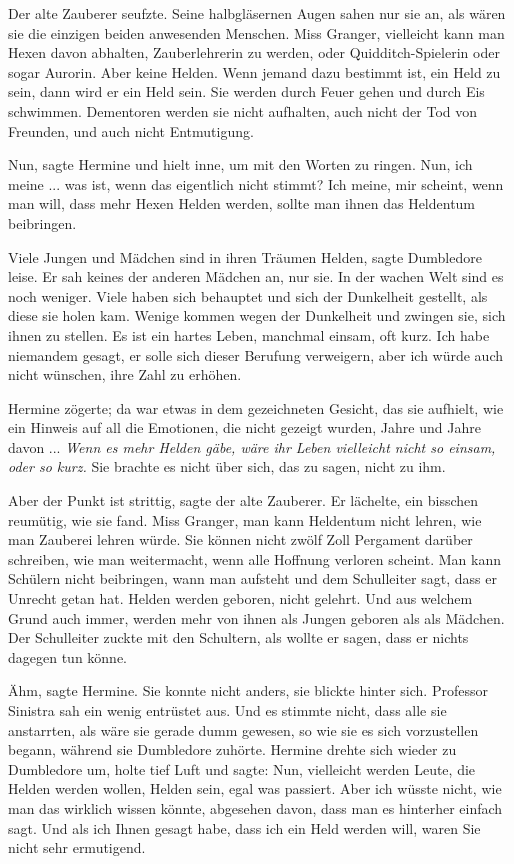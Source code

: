 Der alte Zauberer seufzte. Seine halbgläsernen Augen sahen nur sie an, als wären
sie die einzigen beiden anwesenden Menschen. \glqq{}Miss Granger, vielleicht kann
man Hexen davon abhalten, Zauberlehrerin zu werden, oder Quidditch-Spielerin
oder sogar Aurorin. Aber keine Helden. Wenn jemand dazu bestimmt ist, ein Held
zu sein, dann wird er ein Held sein. Sie werden durch Feuer gehen und durch Eis
schwimmen. Dementoren werden sie nicht aufhalten, auch nicht der Tod von
Freunden, und auch nicht Entmutigung.\grqq{}

\glqq{}Nun\grqq{}, sagte Hermine und hielt inne, um mit den Worten zu ringen.
\glqq{}Nun, ich meine ... was ist, wenn das eigentlich nicht stimmt? Ich meine,
mir scheint, wenn man will, dass mehr Hexen Helden werden, sollte man ihnen das
Heldentum beibringen.\grqq{}

\glqq{}Viele Jungen und Mädchen sind in ihren Träumen Helden\grqq{}, sagte
Dumbledore leise. Er sah keines der anderen Mädchen an, nur sie. \glqq{}In der
wachen Welt sind es noch weniger. Viele haben sich behauptet und sich der
Dunkelheit gestellt, als diese sie holen kam. Wenige kommen wegen der Dunkelheit
und zwingen sie, sich ihnen zu stellen. Es ist ein hartes Leben, manchmal
einsam, oft kurz. Ich habe niemandem gesagt, er solle sich dieser Berufung
verweigern, aber ich würde auch nicht wünschen, ihre Zahl zu erhöhen.\grqq{}

Hermine zögerte; da war etwas in dem gezeichneten Gesicht, das sie aufhielt, wie
ein Hinweis auf all die Emotionen, die nicht gezeigt wurden, Jahre und Jahre
davon ... \emph{Wenn es mehr Helden gäbe, wäre ihr Leben vielleicht nicht so
einsam, oder so kurz.} Sie brachte es nicht über sich, das zu sagen, nicht zu
ihm.

\glqq{}Aber der Punkt ist strittig\grqq{}, sagte der alte Zauberer. Er lächelte,
ein bisschen reumütig, wie sie fand. \glqq{}Miss Granger, man kann Heldentum
nicht lehren, wie man Zauberei lehren würde. Sie können nicht zwölf Zoll
Pergament darüber schreiben, wie man weitermacht, wenn alle Hoffnung verloren
scheint. Man kann Schülern nicht beibringen, wann man aufsteht und dem
Schulleiter sagt, dass er Unrecht getan hat. Helden werden geboren, nicht
gelehrt. Und aus welchem Grund auch immer, werden mehr von ihnen als Jungen
geboren als als Mädchen.\grqq{} Der Schulleiter zuckte mit den Schultern, als
wollte er sagen, dass er nichts dagegen tun könne.

\glqq{}Ähm\grqq{}, sagte Hermine. Sie konnte nicht anders, sie blickte hinter
sich. Professor Sinistra sah ein wenig entrüstet aus. Und es stimmte nicht, dass
alle sie anstarrten, als wäre sie gerade dumm gewesen, so wie sie es sich
vorzustellen begann, während sie Dumbledore zuhörte. Hermine drehte sich wieder
zu Dumbledore um, holte tief Luft und sagte: \glqq{}Nun, vielleicht werden Leute,
die Helden werden wollen, Helden sein, egal was passiert. Aber ich wüsste nicht,
wie man das wirklich wissen könnte, abgesehen davon, dass man es hinterher
einfach sagt. Und als ich Ihnen gesagt habe, dass ich ein Held werden will,
waren Sie nicht sehr ermutigend.\grqq{}

